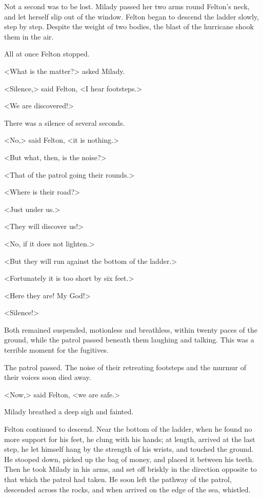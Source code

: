 Not a second was to be lost. Milady passed her two arms round Felton's neck, and let herself slip out of the window. Felton began to descend the ladder slowly, step by step. Despite the weight of two bodies, the blast of the hurricane shook them in the air. 

All at once Felton stopped. 

<What is the matter?> asked Milady. 

<Silence,> said Felton, <I hear footsteps.> 

<We are discovered!> 

There was a silence of several seconds. 

<No,> said Felton, <it is nothing.> 

<But what, then, is the noise?> 

<That of the patrol going their rounds.> 

<Where is their road?> 

<Just under us.> 

<They will discover us!> 

<No, if it does not lighten.> 

<But they will run against the bottom of the ladder.> 

<Fortunately it is too short by six feet.> 

<Here they are! My God!> 

<Silence!> 

Both remained suspended, motionless and breathless, within twenty paces of the ground, while the patrol passed beneath them laughing and talking. This was a terrible moment for the fugitives. 

The patrol passed. The noise of their retreating footsteps and the murmur of their voices soon died away. 

<Now,> said Felton, <we are safe.> 

Milady breathed a deep sigh and fainted. 

Felton continued to descend. Near the bottom of the ladder, when he found no more support for his feet, he clung with his hands; at length, arrived at the last step, he let himself hang by the strength of his wrists, and touched the ground. He stooped down, picked up the bag of money, and placed it between his teeth. Then he took Milady in his arms, and set off briskly in the direction opposite to that which the patrol had taken. He soon left the pathway of the patrol, descended across the rocks, and when arrived on the edge of the sea, whistled. 

